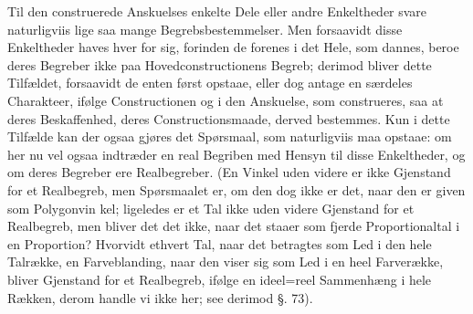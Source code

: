 \documentclass[12pt]{book}
\def\textit#1{#1}%
\newcommand{\opage}[1]{\marginnote{\footnotesize\textit{[#1]}}}
\begin{document}
Til den construerede Anskuelses enkelte Dele eller andre Enkeltheder svare
naturligviis lige saa mange Begrebsbestemmelser. Men forsaavidt disse
Enkeltheder haves hver for sig, forinden de forenes i det Hele, som dannes,
beroe deres Begreber ikke paa Hovedconstructionens Begreb; derimod bliver dette
Tilfældet, forsaavidt de enten først opstaae, eller dog antage en særdeles
Charakteer, ifølge Constructionen og i den Anskuelse, som construeres, saa at
deres Beskaffenhed, deres Constructionsmaade, derved bestemmes. Kun i dette
Tilfælde kan der ogsaa gjøres det Spørsmaal, som naturligviis maa opstaae: om
her nu vel ogsaa indtræder en real Begriben med Hensyn til disse Enkeltheder,
og om deres Begreber ere Realbegreber. (En Vinkel uden videre er ikke Gjenstand
for et Realbegreb, men Spørsmaalet er, om den dog ikke er det, naar den er
given som Polygonvin%
\opage{173}kel; ligeledes er et Tal ikke uden videre Gjenstand for et Realbegreb, men
bliver det det ikke, naar det staaer som fjerde Proportionaltal i en
Proportion? Hvorvidt ethvert Tal, naar det betragtes som Led i den hele
Talrække, en Farveblanding, naar den viser sig som Led i en heel Farverække,
bliver Gjenstand for et Realbegreb, ifølge en ideel=reel Sammenhæng i hele
Rækken, derom handle vi ikke her; see derimod §. 73).
\end{document}
